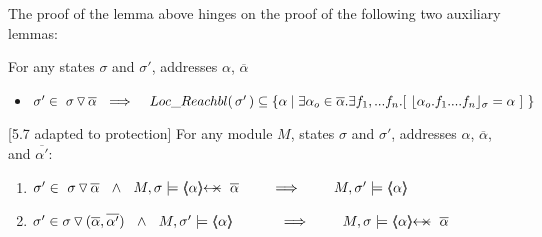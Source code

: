 The proof of the lemma above hinges on the proof of the following two auxiliary lemmas:

\begin{lemma} 
\label{lemma:lrelavant:push}
For any  states  $\sigma$ and $\sigma'$, addresses $\alpha$, $\overline \alpha$
\begin{itemize}
\item
$\sigma' \in \PushS {\alpha} {\sigma} \ \ \Longrightarrow  \ \ \   \LRelevantO   {\sigma'}  \subseteq \{ \alpha \mid \exists \alpha_o\in \overline \alpha.\exists f_1,...f_n.[\ {\interpret {\sigma} {\alpha_o.f_1....f_{n}}}=\alpha\ ]  \ \} $
\end{itemize}
\end{lemma}



\begin{lemma} 
\label{lemma:push:ass:state:P}[5.7 adapted to protection]
For any module  $M$, states  $\sigma$ and $\sigma'$, addresses $\alpha$, $\overline \alpha$, and $\overline {\alpha'}$:
\\
\begin{enumerate}
 \item
 \label{lemma:push:ass:state:one:P}
$\sigma' \in \PushS {\alpha} {\sigma}\ \ \wedge\ \ M,  \sigma \models \protectedFrom {\alpha} {\overline {\alpha}}
\ \ \ \  \ \ \     \Longrightarrow \ \ \ \  \ \ \   M, \sigma' \models \inside  {\alpha} $
\item
\label{lemma:push:ass:state:two:P}
$\sigma' \in \PushSLong{(\overline \alpha, \overline {\alpha'})} {\sigma}\ \ \wedge\ \ M,  \sigma' \models \inside {\alpha} \ \ \ 
\ \ \ \  \ \ \    \Longrightarrow  \ \ \ \  \ \ \   M, \sigma \models \protectedFrom {\alpha} {\overline {\alpha}} $
\end{enumerate}
\end{lemma}


